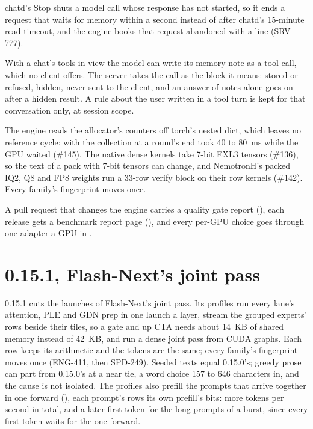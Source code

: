 chatd's Stop shuts a model call whose response has not started, so it ends a request that waits for memory within a second instead of after chatd's 15-minute read timeout, and the engine books that request abandoned with a \code{[req]} line (SRV-777).

With a chat's tools in view the model can write its memory note as a  tool call, which no client offers. The server takes the call as the block it means: stored or refused, hidden, never sent to the client, and an answer of notes alone goes on after a hidden result. A rule about the user written in a tool turn is kept for that conversation only, at session scope.

The engine reads the allocator's counters off torch's nested dict, which leaves no reference cycle: with  the collection at a round's end took 40 to 80~ms while the GPU waited (\#145). The native dense kernels take 7-bit EXL3 tensors (\#136), so the text of a pack with 7-bit tensors can change, and NemotronH's packed IQ2, Q8 and FP8 weights run a 33-row verify block on their row kernels (\#142). Every family's fingerprint moves once.

A pull request that changes the engine carries a quality gate report (), each release gets a benchmark report page (), and every per-GPU choice goes through one adapter a GPU in .

\section{0.15.1, Flash-Next's joint pass}\label{sec:changelog-0151}

0.15.1 cuts the launches of Flash-Next's joint pass. Its profiles run every lane's attention, PLE and GDN prep in one launch a layer, stream the grouped experts' rows beside their tiles, so a gate and up CTA needs about 14~KB of shared memory instead of 42~KB, and run a dense joint pass from CUDA graphs. Each row keeps its arithmetic and the tokens are the same; every family's fingerprint moves once (ENG-411, then SPD-249). Seeded texts equal 0.15.0's; greedy prose can part from 0.15.0's at a near tie, a word choice 157 to 646 characters in, and the cause is not isolated. The profiles also prefill the prompts that arrive together in one forward (), each prompt's rows its own prefill's bits: more tokens per second in total, and a later first token for the long prompts of a burst, since every first token waits for the one forward.

